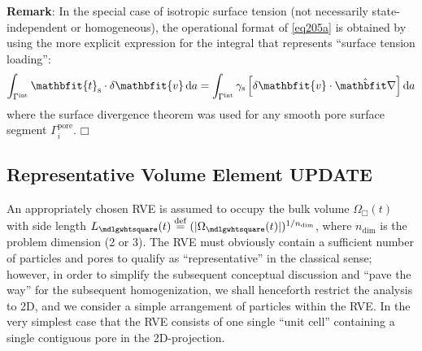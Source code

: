 \documentclass[10pt,a4paper]{article}
\renewcommand{\ta}[1]{\mathbfit{#1}}
\renewcommand{\Box}{\mdlgwhtsquare}
\newcommand{\pore}{\mathrm{pore}}
\newcommand{\internal}{\mathrm{int}}
\newcommand{\surf}{\mathrm{s}}
\newcommand{\NDIM}{n_\mathrm{dim}}
\begin{document}
\textbf{Remark}: In the special case of isotropic surface tension (not necessarily state-independent or homogeneous), the operational format of \eqref{eq205a} is obtained by using the more explicit expression for the integral that represents ``surface tension loading'':
\begin{equation}
    \int_{\Gamma^\internal} \ta{t}_\surf \cdot \delta\ta{v} \dif a =
    \int_{\Gamma^\internal} \gamma_\surf\left[\delta\ta{v}\cdot\hat{\diff}\right] \dif a
\label{eq206}
\end{equation}
where the surface divergence theorem was used for any smooth pore surface segment $\Gamma^\pore_i$. $\Box$

\subsection{Representative Volume Element \textbf{UPDATE}}

An appropriately chosen RVE is assumed to occupy the bulk volume $\Omega_\Box(t)$ with side length $L_\Box(t)\defeq(|\Omega_\Box(t)|)^{1/\NDIM}$, where $\NDIM$ is the problem dimension (2 or 3). The RVE must obviously contain a sufficient number of particles and pores to qualify as ``representative'' in the classical sense; however, in order to simplify the subsequent conceptual discussion and ``pave the way'' for the subsequent homogenization, we shall henceforth restrict the analysis to 2D, and we consider a simple arrangement of particles within the RVE. In the very simplest case that the RVE consists of one single ``unit cell'' containing a single contiguous pore in the 2D-projection.
\end{document}
